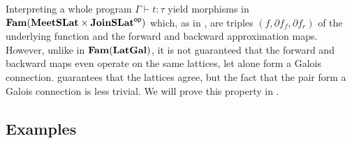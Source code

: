 Interpreting a whole program $\Gamma \vdash t : \tau$ yield morphisms in
$\mathbf{Fam}(\mathbf{MeetSLat} \times \mathbf{JoinSLat}^{\mathsf{op}})$ which, as in , are triples
$(f, \partial f_f, \partial f_r)$ of the underlying function and the forward and backward approximation
maps. However, unlike in $\mathbf{Fam}(\mathbf{LatGal})$, it is not guaranteed that the forward and backward maps even operate on
the same lattices, let alone form a Galois connection.  guarantees that
the lattices agree, but the fact that the pair form a Galois connection is less trivial. We will prove this
property in .



\subsection{Examples}
\label{sec:language:examples}


